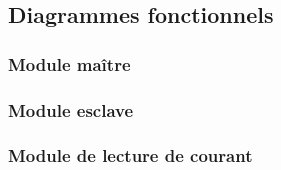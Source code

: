 \subsection{Diagrammes fonctionnels}
	\paragraph*{}
	\subsubsection{Module maître}
		\paragraph*{}
	\subsubsection{Module esclave}
		\paragraph*{}
	\subsubsection{Module de lecture de courant}
		\paragraph*{}